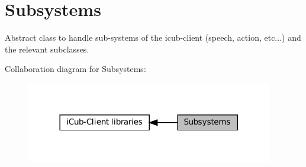 \hypertarget{group__icubclient__subsystems}{}\section{Subsystems}
\label{group__icubclient__subsystems}


Abstract class to handle sub-\/systems of the icub-\/client (speech, action, etc...) and the relevant subclasses.  


Collaboration diagram for Subsystems\+:
\nopagebreak
\begin{figure}[H]
\begin{center}
\leavevmode
\includegraphics[width=305pt]{group__icubclient__subsystems}
\end{center}
\end{figure}
